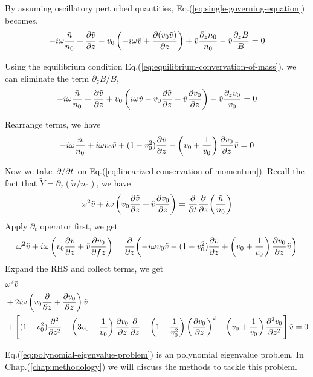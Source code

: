 By assuming oscillatory perturbed quantities, Eq.(\ref{eq:single-governing-equation}) becomes,
\begin{equation}
	-i\omega\frac{\tilde{n}}{n_0} 
	+ \pdv{\tilde{v}}{z} - v_0\left(-i\omega\tilde{v} 
	+ \pdv{(v_0\tilde{v})}{z}\right) 
	+ \tilde{v}\frac{\partial_z n_0}{n_0} 
	- \tilde{v}\frac{\partial_z B}{B} 
	= 0
\end{equation}

Using the equilibrium condition Eq.(\ref{eq:equilibrium-convervation-of-mass}), we can eliminate the term $\partial_z B/B$,
\[ 
	-i\omega\frac{\tilde{n}}{n_0} 
	+ \pdv{\tilde{v}}{z} 
	+ v_0\left(i\omega \tilde{v} - v_0\pdv{\tilde{v}}{z} - \tilde{v}\pdv{v_0}{z} \right)
	- \tilde{v}\frac{\partial_z v_0}{v_0} 
	= 0 
\]

Rearrange terms, we have
\[
	-i\omega\frac{\tilde{n}}{n_0} 
	+ i\omega v_0\tilde{v}
	+ (1-v_0^2)\pdv{\tilde{v}}{z} 
	- \left(v_0+\frac{1}{v_0}\right)\pdv{v_0}{z}\tilde{v} = 0	
\]

Now we take $\pdv*{t}$ on Eq.(\ref{eq:linearized-conservation-of-momentum}). Recall the fact that $\tilde{Y} = \partial_z(\tilde{n}/n_0)$, we have
\[ 
	\omega^2\tilde{v} + i\omega\left(v_0\pdv{\tilde{v}}{z} + \tilde{v}\pdv{v_0}{z}\right) 
	= \pdv{t}\pdv{z}(\frac{\tilde{n}}{n_0}) 
\]
Apply $\partial_t$ operator first, we get
\[ 
	\omega^2\tilde{v} + i\omega\left(v_0\pdv{\tilde{v}}{z} + \tilde{v}\pdv{v_0}{fz}\right) 
	= \pdv{z}(-i\omega v_0\tilde{v}
	- (1-v_0^2)\pdv{\tilde{v}}{z} 
	+ \left(v_0+\frac{1}{v_0}\right)\pdv{v_0}{z}\tilde{v})	
\]
Expand the RHS and collect terms, we get
\begin{equation} \label{eq:polynomial-eigenvalue-problem}
	\begin{aligned}
		&\omega^2 \tilde{v} \\ 
		&+2i\omega\left(v_0\pdv{}{z} + \pdv{v_0}{z}\right) \tilde{v} \\ 
		&+\left[ (1-v_0^2)\pdv[2]{}{z} 
		-\left(3v_0 + \frac{1}{v_0}\right)\pdv{v_0}{z}\pdv{}{z} 
		- \left(1-\frac{1}{v_0^2}\right)\left(\pdv{v_0}{z}\right)^2 
		- \left(v_0+\frac{1}{v_0}\right)\pdv[2]{v_0}{z} \right]\tilde{v}
		= 0
	\end{aligned}
\end{equation}

Eq.(\ref{eq:polynomial-eigenvalue-problem}) is an polynomial eigenvalue problem. In Chap.(\ref{chap:methodology}) we will discuss the methods to tackle this problem.
